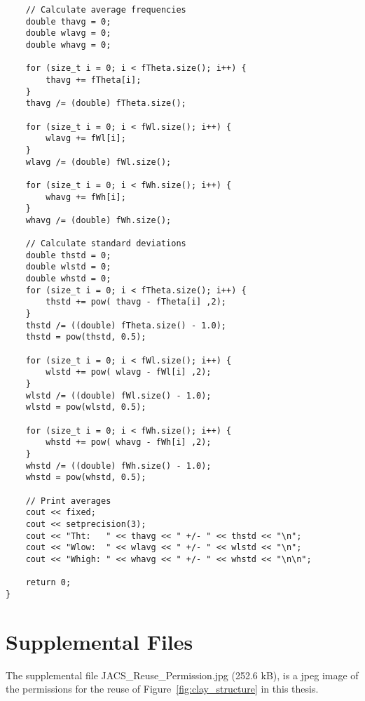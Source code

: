 \begin{singlespace}
\begin{verbatim}
    // Calculate average frequencies
    double thavg = 0;
    double wlavg = 0;
    double whavg = 0;

    for (size_t i = 0; i < fTheta.size(); i++) {
        thavg += fTheta[i];
    }
    thavg /= (double) fTheta.size();

    for (size_t i = 0; i < fWl.size(); i++) {
        wlavg += fWl[i];
    }
    wlavg /= (double) fWl.size();

    for (size_t i = 0; i < fWh.size(); i++) {
        whavg += fWh[i];
    }
    whavg /= (double) fWh.size();

    // Calculate standard deviations
    double thstd = 0;
    double wlstd = 0;
    double whstd = 0;
    for (size_t i = 0; i < fTheta.size(); i++) {
        thstd += pow( thavg - fTheta[i] ,2);
    }
    thstd /= ((double) fTheta.size() - 1.0);
    thstd = pow(thstd, 0.5);

    for (size_t i = 0; i < fWl.size(); i++) {
        wlstd += pow( wlavg - fWl[i] ,2);
    }
    wlstd /= ((double) fWl.size() - 1.0);
    wlstd = pow(wlstd, 0.5);

    for (size_t i = 0; i < fWh.size(); i++) {
        whstd += pow( whavg - fWh[i] ,2);
    }
    whstd /= ((double) fWh.size() - 1.0);
    whstd = pow(whstd, 0.5);

    // Print averages
    cout << fixed;
    cout << setprecision(3);
    cout << "Tht:   " << thavg << " +/- " << thstd << "\n";
    cout << "Wlow:  " << wlavg << " +/- " << wlstd << "\n";
    cout << "Whigh: " << whavg << " +/- " << whstd << "\n\n";
        
    return 0;
}
\end{verbatim}
\end{singlespace}

\chapter{Supplemental Files}
The supplemental file JACS\_Reuse\_Permission.jpg (252.6 kB), is a jpeg image of the permissions for the reuse of Figure~\ref{fig:clay_structure} in this thesis.
 
